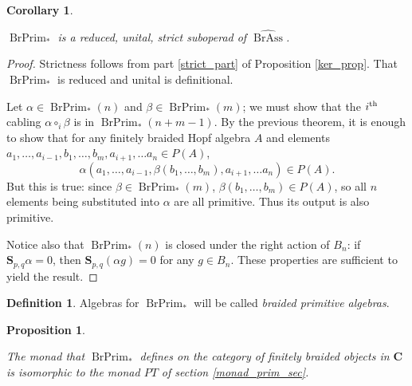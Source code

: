 \documentclass[12pt]{article}
\DeclareMathOperator{\BrAss}{BrAss}
\DeclareMathOperator{\BrPrim}{BrPrim}
\newcommand{\BrAsshat}{\widehat{\BrAss}} %
\newcommand{\bC} {\mathbf{C}}
\newcommand{\bS} {\mathbf{S}}
\newcommand{\nth}{\textsuperscript{th}}
\theoremstyle{plain}
\newtheorem{prop}[thm]{Proposition}
\newtheorem{cor}[thm]{Corollary}
\theoremstyle{definition}
\newtheorem{defn}[thm]{Definition}
\theoremstyle{remark}
\begin{document}
\begin{cor} \label{br_prim_operad_cor}

$\BrPrim_*$ is a reduced, unital, strict suboperad of $\BrAsshat$.

\end{cor}

\begin{proof}

Strictness follows from part \ref{strict_part} of Proposition \ref{ker_prop}.  That $\BrPrim_*$ is reduced and unital is definitional.

Let $\alpha \in \BrPrim_*(n)$ and $\beta \in \BrPrim_*(m)$; we must show that the $i\nth$ cabling $\alpha \circ_i \beta$ is in $\BrPrim_*(n+m-1)$.  By the previous theorem, it is enough to show that for any finitely braided Hopf algebra $A$ and elements $a_1, \dots, a_{i-1}, b_1, \dots, b_m, a_{i+1}, \dots a_n \in P(A)$, 
%
$$\alpha(a_1, \dots, a_{i-1}, \beta(b_1, \dots, b_m), a_{i+1}, \dots a_n) \in P(A).$$
%
But this is true: since $\beta \in \BrPrim_*(m)$, $\beta(b_1, \dots, b_m) \in P(A)$, so all $n$ elements being substituted into $\alpha$ are all primitive.  Thus its output is also primitive.

Notice also that $\BrPrim_*(n)$ is closed under the right action of $B_n$: if $\bS_{p, q} \alpha = 0$, then $\bS_{p, q} (\alpha g) = 0$ for any $g \in B_n$.  These properties are sufficient to yield the result.

\end{proof}

\begin{defn} Algebras for $\BrPrim_*$ will be called \emph{braided primitive algebras}. \end{defn}

\begin{prop} \label{prim_prop}

The monad that $\BrPrim_*$ defines on the category of finitely braided objects in $\bC$ is isomorphic to the monad $PT$ of section \ref{monad_prim_sec}.

\end{prop}
\end{document}
